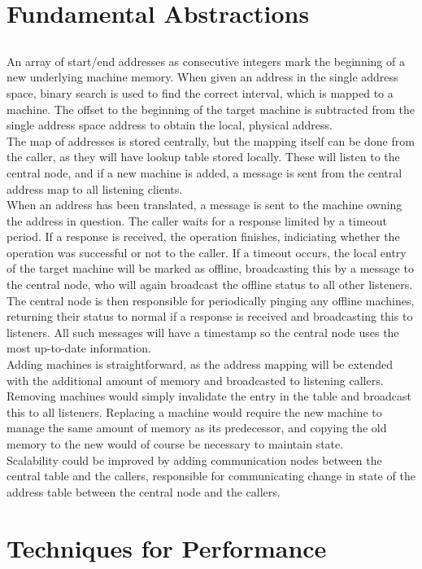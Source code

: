 \documentclass[12pt]{article}
\begin{document}
\section{Fundamental Abstractions} %

\subsection{} %
An array of start/end addresses as consecutive integers mark the beginning of a new underlying machine memory. When given an address in the single address space, binary search is used to find the correct interval, which is mapped to a machine. The offset to the beginning of the target machine is subtracted from the single address space address to obtain the local, physical address. \\
The map of addresses is stored centrally, but the mapping itself can be done from the caller, as they will have lookup table stored locally. These will listen to the central node, and if a new machine is added, a message is sent from the central address map to all listening clients. \\
When an address has been translated, a message is sent to the machine owning the address in question. The caller waits for a response limited by a timeout period. If a response is received, the operation finishes, indiciating whether the operation was successful or not to the caller. If a timeout occurs, the local entry of the target machine will be marked as offline, broadcasting this by a message to the central node, who will again broadcast the offline status to all other listeners. The central node is then responsible for periodically pinging any offline machines, returning their status to normal if a response is received and broadcasting this to listeners. All such messages will have a timestamp so the central node uses the most up-to-date information.\\
Adding machines is straightforward, as the address mapping will be extended with the additional amount of memory and broadcasted to listening callers. Removing machines would simply invalidate the entry in the table and broadcast this to all listeners. Replacing a machine would require the new machine to manage the same amount of memory as its predecessor, and copying the old memory to the new would of course be necessary to maintain state. \\
Scalability could be improved by adding communication nodes between the central table and the callers, responsible for communicating change in state of the address table between the central node and the callers.

\subsection{} %


\section{Techniques for Performance}

\subsection{}
\end{document}
